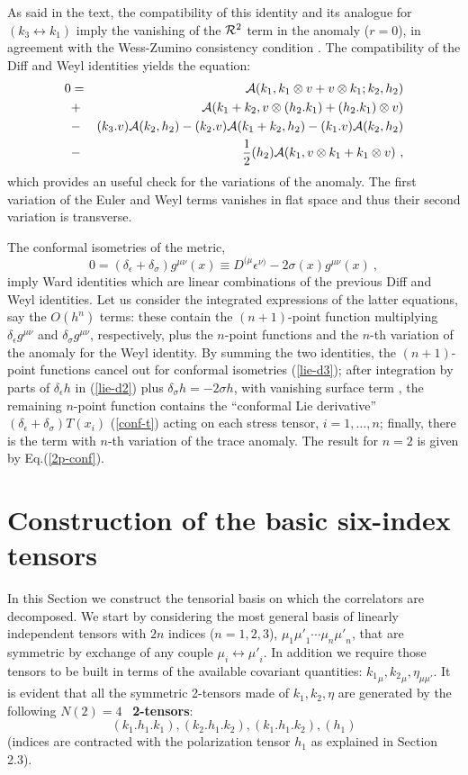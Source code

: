 \documentclass[11pt]{article}
\newcommand{\beq}{\begin{equation}}
\newcommand{\eeq}{\end{equation}}
\newcommand{\bea}{\begin{eqnarray}}
\newcommand{\eea}{\end{eqnarray}}
\def\s{\sigma}
\def\d{\delta}
\def\eps{\epsilon}
\def\half{{1 \over 2}}
\def\nl{\nonumber\\}
\newcommand{\nta}[1]{{N(#1)}}   %
\def\mup{{\mu'}}    %
\def\gflat{{\eta}}  %
\begin{document}
As said in the text, the compatibility of this identity and its
analogue for $(k_3 \leftrightarrow k_1)$ imply the vanishing of the
${\cal R}^2$ term in the anomaly ($r=0$), in agreement with the Wess-Zumino
consistency condition \cite{chi-book}\cite{cc}.
The compatibility of the Diff and Weyl identities yields
the equation:
\bea 
0&=& {\cal A}(k_1,k_1\otimes v +v\otimes k_1;k_2,h_2) \nl
& +& {\cal A}(k_1+k_2, v\otimes (h_2 . k_1) + (h_2 . k_1) \otimes v) \nl
& -& (k_3.v) {\cal A}(k_2,h_2)  
- (k_2.v) {\cal A}(k_1+k_2,h_2) 
- (k_1.v) {\cal A}(k_2,h_2) \nl
& -& \half (h_2) {\cal A}(k_1,v\otimes k_1 +k_1 \otimes v) \ ,
\label{compat1}
\eea 
which provides an useful check for the variations
of the anomaly. The first variation of the Euler and Weyl terms 
vanishes in flat space and thus their second variation is transverse.

The conformal isometries of the metric,
\beq
0=\left(\d_\eps +\d_\s \right) g^{\mu\nu} (x)\equiv
D^{(\mu} \eps^{\nu)} -2\s(x) g^{\mu\nu}(x)\ ,
\label{lie-d3}\eeq
imply Ward identities which are linear
combinations of the previous Diff and Weyl identities.
Let us consider the integrated expressions of the latter
equations, say the $O(h^n)$ terms: these
contain the $(n+1)$-point function multiplying
$\d_\eps g^{\mu\nu}$ and $\d_\s g^{\mu\nu}$, respectively,
plus the $n$-point functions and the $n$-th variation of the
anomaly for the Weyl identity.
By summing the two identities, the $(n+1)$-point functions cancel out for
conformal isometries (\ref{lie-d3}); after integration by
parts of $\d_\eps h$ in (\ref{lie-d2}) plus $\d_\s h = -2\s h$,
with vanishing surface term \cite{cardy2}, the remaining $n$-point function
contains the ``conformal Lie derivative'' 
$(\d_\eps +\d_\s) T(x_i)$ (\ref{conf-t}) acting on each stress tensor,
$i=1,\dots,n$; finally, there is the term with
$n$-th variation of the trace anomaly. 
The result for $n=2$ is given by Eq.(\ref{2p-conf}).



\section{Construction of the basic six-index tensors} 
\label{app-tens}

In this Section we construct the tensorial basis 
on which the correlators are decomposed. 
 We start by considering the most general basis 
of linearly independent tensors with $2 n$ indices ($n=1,2,3$),  
$\mu_1\mup_1\cdots \mu_n\mup_n$, 
that are symmetric by exchange of any couple $\mu_i \leftrightarrow \mup_i$. 
In addition we require those tensors to be built in terms of the  
available covariant quantities:  
${k_1}_{\mu},{k_2}_{\mu},\gflat_{\mu\mup}$. 
It is evident that all the symmetric  2-tensors made of 
$k_1,k_2,\gflat$ are generated by the following  $\nta{2}=4$~  
{\bf 2-tensors}:   
\beq\label{2-tens} 
 (k_1.h_1.k_1), (k_2.h_1.k_2), (k_1.h_1.k_2), (h_1)  
\eeq 
(indices are contracted with the polarization tensor $h_1$
as explained in Section 2.3). 
  
\end{document}
